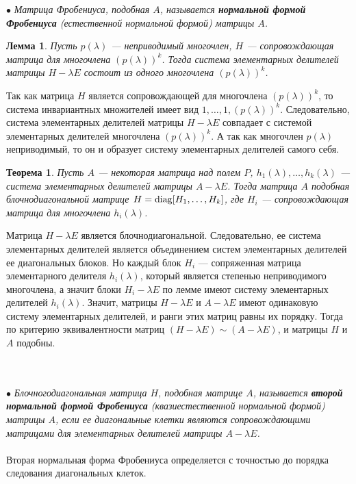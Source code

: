 $\bullet$ \textit{Матрица Фробениуса, подобная $A$, называется \textbf{нормальной формой Фробениуса} (естественной нормальной формой) матрицы $A$.}
\newtheorem*{lem12_11_2}{Лемма}\begin{lem12_11_2}Пусть $p(\lambda)$ --- неприводимый многочлен, $H$ --- сопровождающая матрица для многочлена $(p(\lambda))^k$. Тогда система элементарных делителей матрицы $H-\lambda E$ состоит из одного многочлена $(p(\lambda))^k$.
\end{lem12_11_2}\begin{Proof}
	Так как матрица $H$ является сопровождающей для многочлена $(p(\lambda))^k$, то система инвариантных множителей имеет вид $1,\ldots,1,(p(\lambda))^k$. Следовательно, система элементарных делителей матрицы $H-\lambda E$ совпадает с системой элементарных делителей многочлена $(p(\lambda))^k$. А так как многочлен $p(\lambda)$ неприводимый, то он и образует систему элементарных делителей самого себя.
\end{Proof}
\newtheorem*{th12_11_2}{Теорема}\begin{th12_11_2}Пусть $A$ --- некоторая матрица над полем $P$, $h_1(\lambda),\dots,h_k(\lambda)$ --- система элементарных делителей матрицы $A-\lambda E$. Тогда матрица $A$ подобная блочнодиагональной матрице $H = \operatorname{diag} [H_1,\dots,H_k]$, где $H_i$ --- сопровождающая матрица для многочлена $h_i(\lambda)$.
\end{th12_11_2}\begin{Proof}
	Матрица $H-\lambda E$ является блочнодиагональной. Следовательно, ее система элементарных делителей является объединением систем элементарных делителей ее диагональных блоков. Но каждый блок $H_i$ --- сопряженная матрица элементарного делителя $h_i(\lambda)$, который является степенью неприводимого многочлена, а значит блоки $H_i - \lambda E$ по лемме имеют систему элементарных делителей $h_i(\lambda)$. Значит, матрицы $H-\lambda E$ и $A-\lambda E$ имеют одинаковую систему элементарных делителей, и ранги этих матриц равны их порядку. Тогда по критерию эквивалентности матриц $(H-\lambda E)\sim (A-\lambda E)$, и матрицы $H$ и $A$ подобны.
\end{Proof}\\\\
$\bullet$ \textit{Блочногодиагональная матрица $H$, подобная матрице $A$, называется \textbf{второй нормальной формой Фробениуса} (квазиестественной нормальной формой) матрицы $A$, если ее диагональные клетки являются сопровождающими матрицами для элементарных делителей матрицы $A-\lambda E$.}\\\\
Вторая нормальная форма Фробениуса определяется с точностью до порядка следования диагональных клеток.





